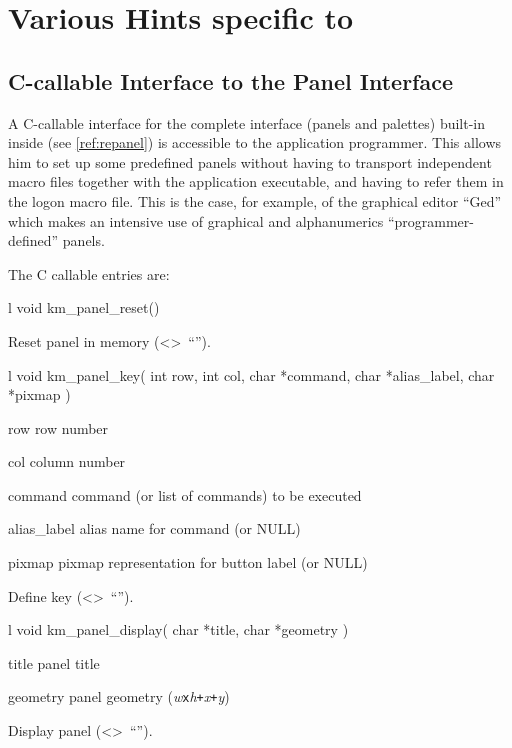 \section{Various Hints specific to \KUIPMotif{}}
 
\subsection{ C-callable Interface to the Panel Interface}
 
A C-callable interface for the complete  interface (panels and
palettes) built-in inside \KUIPMotif{} (see \ref{ref:repanel})
is accessible to the application programmer. This allows him
to set up some predefined panels without having to transport
independent macro files together with the application executable,
and having to refer them in the logon macro file.
This is the case, for example,  of the graphical editor ``Ged'' which makes
an intensive use of graphical and alphanumerics ``programmer-defined''
panels.
 
The C callable entries are:

\begin{Gray}{l}
void km_panel_reset()
\end{Gray}
Reset panel in memory (<>~``'').

\begin{Gray}{l}
void km_panel_key( int row, int col,  char *command, 
                   char *alias_label, char *pixmap )
\end{Gray}
\Pdesc\begin{DLtt}{\mbox{\hspace{7em}}}
\item[row] row number
\item[col] column number
\item[command]  command (or list of commands) to be executed
\item[alias_label] alias name for command (or NULL)
\item[pixmap] pixmap representation for button label (or NULL)
\end{DLtt}
Define key (<>~``'').

\begin{Gray}{l}
void km_panel_display( char *title, char *geometry )
\end{Gray}
\Pdesc\begin{DLtt}{\mbox{\hspace{7em}}}
\item[title] panel title
\item[geometry] panel geometry
  (\textsl{w}\texttt{x}\textsl{h}\texttt{+}\textsl{x}\texttt{+}\textsl{y}) 
\end{DLtt}
Display panel (<>~``'').


